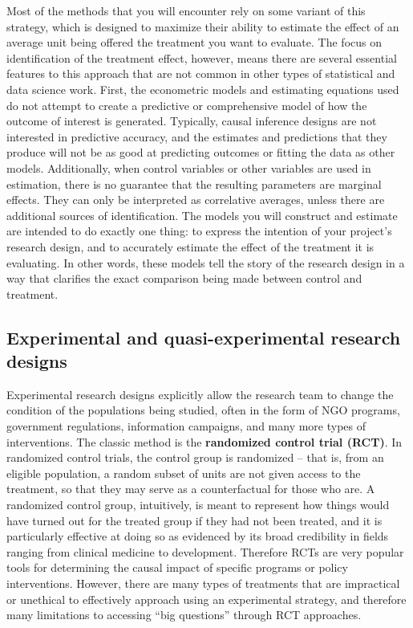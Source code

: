 Most of the methods that you will encounter rely on some variant of this strategy,
which is designed to maximize their ability to estimate the effect
of an average unit being offered the treatment you want to evaluate.
The focus on identification of the treatment effect, however,
means there are several essential features to this approach
that are not common in other types of statistical and data science work.
First, the econometric models and estimating equations used
do not attempt to create a predictive or comprehensive model
of how the outcome of interest is generated.
Typically, causal inference designs are not interested in predictive accuracy,
and the estimates and predictions that they produce
will not be as good at predicting outcomes or fitting the data as other models.
Additionally, when control variables or other variables are used in estimation,
there is no guarantee that the resulting parameters are marginal effects.
They can only be interpreted as correlative averages,
unless there are additional sources of identification.
The models you will construct and estimate are intended to do exactly one thing:
to express the intention of your project's research design,
and to accurately estimate the effect of the treatment it is evaluating.
In other words, these models tell the story of the research design
in a way that clarifies the exact comparison being made between control and treatment.

\subsection{Experimental and quasi-experimental research designs}

Experimental research designs explicitly allow the research team
to change the condition of the populations being studied,
often in the form of NGO programs, government regulations,
information campaigns, and many more types of interventions.\cite{banerjee2009experimental}
The classic method is the \textbf{randomized control trial (RCT)}.
In randomized control trials, the control group is randomized --
that is, from an eligible population,
a random subset of units are not given access to the treatment,
so that they may serve as a counterfactual for those who are.
A randomized control group, intuitively, is meant to represent
how things would have turned out for the treated group
if they had not been treated, and it is particularly effective at doing so
as evidenced by its broad credibility in fields ranging from clinical medicine to development.
Therefore RCTs are very popular tools for determining the causal impact
of specific programs or policy interventions.
However, there are many types of treatments that are impractical or unethical
to effectively approach using an experimental strategy,
and therefore many limitations to accessing ``big questions''
through RCT approaches.

